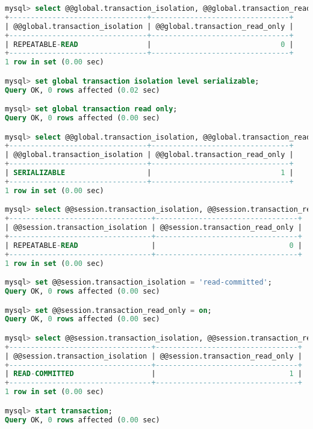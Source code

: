 \documentclass{article}
\begin{document}
\begin{lstlisting}[language=sql]
mysql> select @@global.transaction_isolation, @@global.transaction_read_only;
+--------------------------------+--------------------------------+
| @@global.transaction_isolation | @@global.transaction_read_only |
+--------------------------------+--------------------------------+
| REPEATABLE-READ                |                              0 |
+--------------------------------+--------------------------------+
1 row in set (0.00 sec)

mysql> set global transaction isolation level serializable;
Query OK, 0 rows affected (0.02 sec)

mysql> set global transaction read only;
Query OK, 0 rows affected (0.00 sec)

mysql> select @@global.transaction_isolation, @@global.transaction_read_only;
+--------------------------------+--------------------------------+
| @@global.transaction_isolation | @@global.transaction_read_only |
+--------------------------------+--------------------------------+
| SERIALIZABLE                   |                              1 |
+--------------------------------+--------------------------------+
1 row in set (0.00 sec)

mysql> select @@session.transaction_isolation, @@session.transaction_read_only;
+---------------------------------+---------------------------------+
| @@session.transaction_isolation | @@session.transaction_read_only |
+---------------------------------+---------------------------------+
| REPEATABLE-READ                 |                               0 |
+---------------------------------+---------------------------------+
1 row in set (0.00 sec)

mysql> set @@session.transaction_isolation = 'read-committed';
Query OK, 0 rows affected (0.00 sec)

mysql> set @@session.transaction_read_only = on;
Query OK, 0 rows affected (0.00 sec)

mysql> select @@session.transaction_isolation, @@session.transaction_read_only;
+---------------------------------+---------------------------------+
| @@session.transaction_isolation | @@session.transaction_read_only |
+---------------------------------+---------------------------------+
| READ-COMMITTED                  |                               1 |
+---------------------------------+---------------------------------+
1 row in set (0.00 sec)

mysql> start transaction;
Query OK, 0 rows affected (0.00 sec)


\end{lstlisting}
\end{document}
